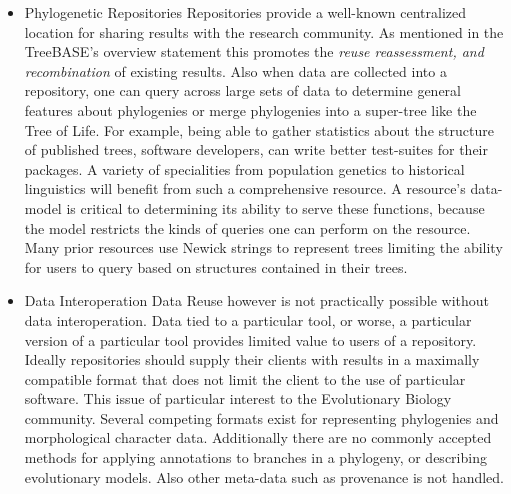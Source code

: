 \documentclass[10pt]{bmc_article}
\newenvironment{bmcformat}{\fussy\setboolean{publ}{true}}{\fussy}
\begin{document}
\begin{bmcformat}

\begin{itemize}
\item Phylogenetic Repositories %
  Repositories provide a well-known centralized location for sharing results
  with the research community. As mentioned in the TreeBASE's overview statement
  this promotes the \textit{reuse reassessment, and recombination}\cite{treebase} of existing results.
  Also when data are collected into a repository, one can query across large sets of data to determine
  general features about phylogenies or merge phylogenies into a super-tree like the Tree of Life.\cite{queries,tol}
  For example, being able to gather statistics about the structure of published trees, software developers,
  can write better test-suites for their packages. A variety of specialities from population genetics to
  historical linguistics will benefit from such a comprehensive resource\cite{queries}.
  A resource's data-model is critical to determining its ability to serve these functions, because the model
  restricts the kinds of queries one can perform on the resource. Many prior resources use Newick 
  strings to represent trees limiting the ability for users to query based on structures contained in their
  trees.\cite{queries}  


\item Data Interoperation
   Data Reuse however is not practically possible without data interoperation. Data tied to
   a particular tool, or worse, a particular version of a particular tool provides limited
   value to users of a repository. Ideally repositories should supply their clients with
   results in a maximally compatible format that does not limit the client to the use of
   particular software. This issue of particular interest to the Evolutionary Biology
   community. Several competing formats exist for representing phylogenies and morphological
   character data. Additionally there are no commonly accepted methods for applying annotations
   to branches in a phylogeny, or describing evolutionary models. Also other meta-data such
   as provenance is not handled.




\end{itemize}
\end{bmcformat}
\end{document}
